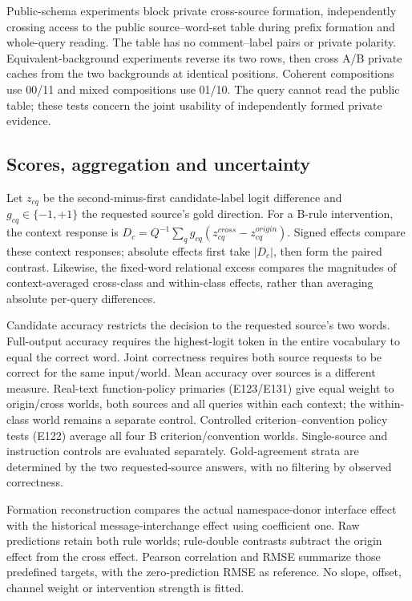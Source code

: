 \documentclass[11pt]{article}
\begin{document}
Public-schema experiments block private cross-source formation, independently crossing access to the public source--word-set table during prefix formation and whole-query reading. The table has no comment--label pairs or private polarity. Equivalent-background experiments reverse its two rows, then cross A/B private caches from the two backgrounds at identical positions. Coherent compositions use 00/11 and mixed compositions use 01/10. The query cannot read the public table; these tests concern the joint usability of independently formed private evidence.

\subsection{Scores, aggregation and uncertainty}\label{scores-aggregation-and-uncertainty}

Let \(z_{cq}\) be the second-minus-first candidate-label logit difference and \(g_{cq}\in\{-1,+1\}\) the requested source's gold direction. For a B-rule intervention, the context response is \(D_c=Q^{-1}\sum_q g_{cq}(z^{cross}_{cq}-z^{origin}_{cq})\). Signed effects compare these context responses; absolute effects first take \(|D_c|\), then form the paired contrast. Likewise, the fixed-word relational excess compares the magnitudes of context-averaged cross-class and within-class effects, rather than averaging absolute per-query differences.

Candidate accuracy restricts the decision to the requested source's two words. Full-output accuracy requires the highest-logit token in the entire vocabulary to equal the correct word. Joint correctness requires both source requests to be correct for the same input/world. Mean accuracy over sources is a different measure. Real-text function-policy primaries (E123/E131) give equal weight to origin/cross worlds, both sources and all queries within each context; the within-class world remains a separate control. Controlled criterion--convention policy tests (E122) average all four B criterion/convention worlds. Single-source and instruction controls are evaluated separately. Gold-agreement strata are determined by the two requested-source answers, with no filtering by observed correctness.

Formation reconstruction compares the actual namespace-donor interface effect with the historical message-interchange effect using coefficient one. Raw predictions retain both rule worlds; rule-double contrasts subtract the origin effect from the cross effect. Pearson correlation and RMSE summarize those predefined targets, with the zero-prediction RMSE as reference. No slope, offset, channel weight or intervention strength is fitted.
\end{document}
